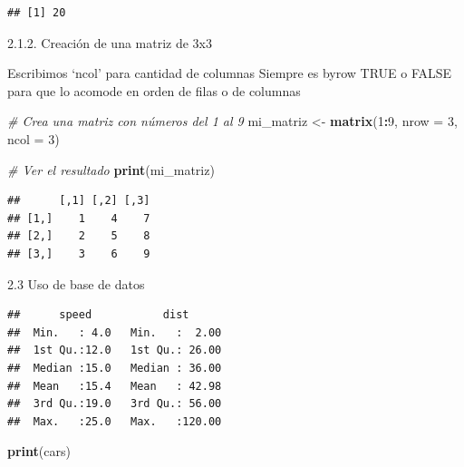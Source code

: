 \documentclass[runningheads]{llncs}
\newenvironment{Shaded}{\begin{snugshade}}{\end{snugshade}}
\newcommand{\AttributeTok}[1]{\textcolor[rgb]{0.13,0.29,0.53}{#1}}
\newcommand{\CommentTok}[1]{\textcolor[rgb]{0.56,0.35,0.01}{\textit{#1}}}
\newcommand{\ConstantTok}[1]{\textcolor[rgb]{0.56,0.35,0.01}{#1}}
\newcommand{\DecValTok}[1]{\textcolor[rgb]{0.00,0.00,0.81}{#1}}
\newcommand{\FunctionTok}[1]{\textcolor[rgb]{0.13,0.29,0.53}{\textbf{#1}}}
\newcommand{\NormalTok}[1]{#1}
\newcommand{\OtherTok}[1]{\textcolor[rgb]{0.56,0.35,0.01}{#1}}
\newcommand{\SpecialCharTok}[1]{\textcolor[rgb]{0.81,0.36,0.00}{\textbf{#1}}}
\begin{document}
\begin{verbatim}
## [1] 20
\end{verbatim}

2.1.2. Creación de una matriz de 3x3

Escribimos `ncol' para cantidad de columnas Siempre es byrow TRUE o
FALSE para que lo acomode en orden de filas o de columnas

\begin{Shaded}
\begin{Highlighting}[]
\CommentTok{\# Crea una matriz con números del 1 al 9}
\NormalTok{mi\_matriz }\OtherTok{\textless{}{-}} \FunctionTok{matrix}\NormalTok{(}\DecValTok{1}\SpecialCharTok{:}\DecValTok{9}\NormalTok{, }\AttributeTok{nrow =} \DecValTok{3}\NormalTok{, }\AttributeTok{ncol =} \DecValTok{3}\NormalTok{)}

\CommentTok{\# Ver el resultado}
\FunctionTok{print}\NormalTok{(mi\_matriz)}
\end{Highlighting}
\end{Shaded}

\begin{verbatim}
##      [,1] [,2] [,3]
## [1,]    1    4    7
## [2,]    2    5    8
## [3,]    3    6    9
\end{verbatim}

2.3 Uso de base de datos

\begin{Shaded}
\end{Shaded}

\begin{verbatim}
##      speed           dist       
##  Min.   : 4.0   Min.   :  2.00  
##  1st Qu.:12.0   1st Qu.: 26.00  
##  Median :15.0   Median : 36.00  
##  Mean   :15.4   Mean   : 42.98  
##  3rd Qu.:19.0   3rd Qu.: 56.00  
##  Max.   :25.0   Max.   :120.00
\end{verbatim}

\begin{Shaded}
\begin{Highlighting}[]
\FunctionTok{print}\NormalTok{(cars)}
\end{Highlighting}
\end{Shaded}
\end{document}
